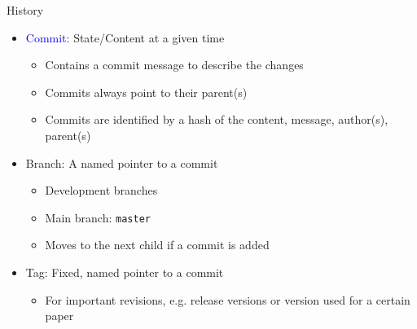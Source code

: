\begin{frame}{History}

  \vspace{1em}
  \begin{itemize}
    \item<1-> \textcolor{blue}{Commit}: State/Content at a given time
      \begin{itemize}
        \item Contains a commit message to describe the changes
        \item Commits always point to their parent(s)
        \item Commits are identified by a hash of the content, message, author(s), parent(s)
      \end{itemize}
    \item<2-> \textcolor{vertexDarkRed}{Branch}: A named pointer to a commit
      \begin{itemize}
        \item Development branches
        \item Main branch: \texttt{master}
        \item Moves to the next child if a commit is added
      \end{itemize}
    \item<4-> \textcolor{green!60!black}{Tag}: Fixed, named pointer to a commit
      \begin{itemize}
        \item For important revisions, e.g. release versions or version used for a certain paper
      \end{itemize}
  \end{itemize}
\end{frame}

